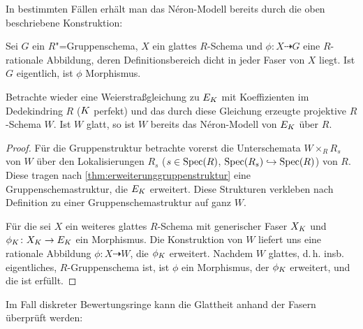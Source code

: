\documentclass[german]{scrreprt}
\begin{document}
In bestimmten Fällen erhält man das Néron-Modell bereits durch die
oben beschriebene Konstruktion:
\begin{Lemma}\label{thm:rationalzumorphismus}
  Sei $G$ ein $R$"=Gruppenschema, $X$ ein glattes $R$-Schema und
  $\phi\colon X\dashrightarrow G$ eine $R$-rationale Abbildung, deren
  Definitionsbereich dicht in jeder Faser von $X$ liegt.
  Ist $G$ eigentlich, ist $\phi$ Morphismus.
  \cite[Proposition IV.6.2]{silverman2}
\end{Lemma}
\begin{Korollar}\label{thm:neronmausweierstrassgl}
  Betrachte wieder eine Weierstraßgleichung zu $E_{K}$ mit
  Koeffizienten im Dedekindring $R$ ($K$ perfekt) und das durch diese
  Gleichung erzeugte projektive $R$-Schema $W$.
  Ist $W$ glatt, so ist $W$ bereits das Néron-Modell von $E_{K}$ über
  $R$.
  \cite[Corollary IV.6.3]{silverman2}
  \begin{proof}
    Für die Gruppenstruktur betrachte vorerst die Unterschemata
    $W\times_R R_s$ von $W$ über den Lokalisierungen
    $R_s$ ($s\in\operatorname{Spec}(R)$, $\operatorname{Spec}(R_s)\hookrightarrow\operatorname{Spec}(R)$) von $R$.
    Diese tragen nach \autoref{thm:erweiterunggruppenstruktur} eine
    Gruppenschemastruktur, die $E_{K}$ erweitert.
    Diese Strukturen verkleben nach Definition zu einer
    Gruppenschemastruktur auf ganz $W$.

    Für die \NAbbEig sei $X$ ein weiteres glattes $R$-Schema mit
    generischer Faser $X_{K}$ und $\phi_{K}\colon X_{K}\to E_{K}$ ein
    Morphismus.
    Die Konstruktion von $W$ liefert uns eine rationale Abbildung
    $\phi\colon X\dashrightarrow W$, die $\phi_{K}$ erweitert.
    Nachdem $W$ glattes, d.\,h. insb. eigentliches, $R$-Gruppenschema
    ist, ist $\phi$ ein Morphismus, der $\phi_{K}$ erweitert, und die
    \NAbbEig ist erfüllt.
  \end{proof}
\end{Korollar}
Im Fall diskreter Bewertungsringe kann die Glattheit anhand der Fasern
überprüft werden:
\end{document}
